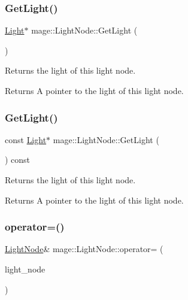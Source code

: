 \subsubsection{\texorpdfstring{Get\+Light()}{GetLight()}\hspace{0.1cm}{\footnotesize\ttfamily [1/2]}}
{\footnotesize\ttfamily \hyperlink{classmage_1_1_light}{Light}$\ast$ mage\+::\+Light\+Node\+::\+Get\+Light (\begin{DoxyParamCaption}{ }\end{DoxyParamCaption})\hspace{0.3cm}{\ttfamily [noexcept]}}

Returns the light of this light node.

\begin{DoxyReturn}{Returns}
A pointer to the light of this light node. 
\end{DoxyReturn}
\hypertarget{classmage_1_1_light_node_a015453d1751cf3ad78846e972957bb5b}{}\label{classmage_1_1_light_node_a015453d1751cf3ad78846e972957bb5b} 
\subsubsection{\texorpdfstring{Get\+Light()}{GetLight()}\hspace{0.1cm}{\footnotesize\ttfamily [2/2]}}
{\footnotesize\ttfamily const \hyperlink{classmage_1_1_light}{Light}$\ast$ mage\+::\+Light\+Node\+::\+Get\+Light (\begin{DoxyParamCaption}{ }\end{DoxyParamCaption}) const\hspace{0.3cm}{\ttfamily [noexcept]}}

Returns the light of this light node.

\begin{DoxyReturn}{Returns}
A pointer to the light of this light node. 
\end{DoxyReturn}
\hypertarget{classmage_1_1_light_node_a41e3ee25215ccc1cbaed4b73e393930a}{}\label{classmage_1_1_light_node_a41e3ee25215ccc1cbaed4b73e393930a} 
\subsubsection{\texorpdfstring{operator=()}{operator=()}\hspace{0.1cm}{\footnotesize\ttfamily [1/2]}}
{\footnotesize\ttfamily \hyperlink{classmage_1_1_light_node}{Light\+Node}\& mage\+::\+Light\+Node\+::operator= (\begin{DoxyParamCaption}\item[{const \hyperlink{classmage_1_1_light_node}{Light\+Node} \&}]{light\+\_\+node }\end{DoxyParamCaption})\hspace{0.3cm}{\ttfamily [delete]}}

